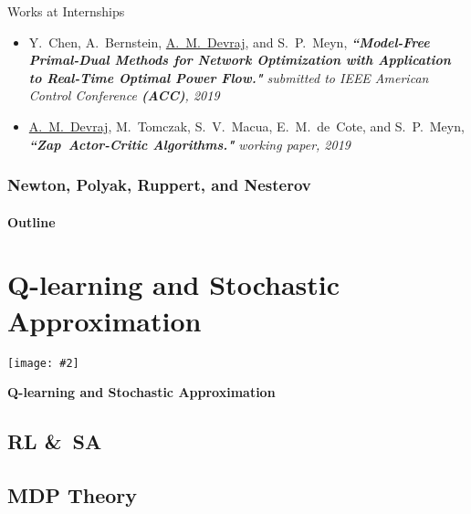 \documentclass[xcolor=dvipsnames, subsection=false]{beamer}
\newcounter{temp}
\newenvironment{framesection}%
{\setcounter{temp}{\value{framenumber}}
\begin{frame}
\thispagestyle{empty}
}%
{\end{frame}\setcounter{framenumber}{\value{temp}}}
\def\ad#1{\notes{{AD:  #1}}}
\def\Ebox#1#2{%
 \begin{center}
\texttt{[image: \#2]}
 \end{center}
 }
\begin{document}
\begin{frame}
\begin{minipage}[t][10cm][t]{\textwidth}
{{\begin{block}{\scriptsize Works at Internships}
\begin{itemize}
\item {\tiny {Y.~Chen, A.~Bernstein, {\underline{A.~M.~Devraj}}, and S.~P.~Meyn, {\bf \textit{``Model-Free Primal-Dual Methods for Network Optimization with Application to Real-Time Optimal Power Flow."}} {{\emph{{submitted to IEEE American Control Conference {\bf \textit{\alert{(ACC)}}}, 2019}}}}}}

\item {\tiny {{\underline{A.~M.~Devraj}}, M.~Tomczak, S.~V.~Macua, E.~M.~de~Cote, and S.~P.~Meyn, {\bf \textit{``Zap~Actor-Critic Algorithms."}} {{\emph{{working paper, 2019}}}}}}
\end{itemize}
\end{block}
}
}

\end{minipage}
\end{frame}
  
\begin{frame}

\thispagestyle{empty}
\setcounter{framenumber}{0}
  
\frametitle{Newton, Polyak, Ruppert, and Nesterov}
\framesubtitle{Outline}

\tableofcontents[hideallsubsections]
\end{frame}

\section{Q-learning and Stochastic Approximation}

\begin{framesection}

\centering

\Ebox{.85}{ZapReviewQuote-1.pdf}

\vfill
\Large\bf  Q-learning and Stochastic Approximation

\end{framesection}
\subsection{RL \&\ SA}

\subsection{MDP Theory}
\end{document}
